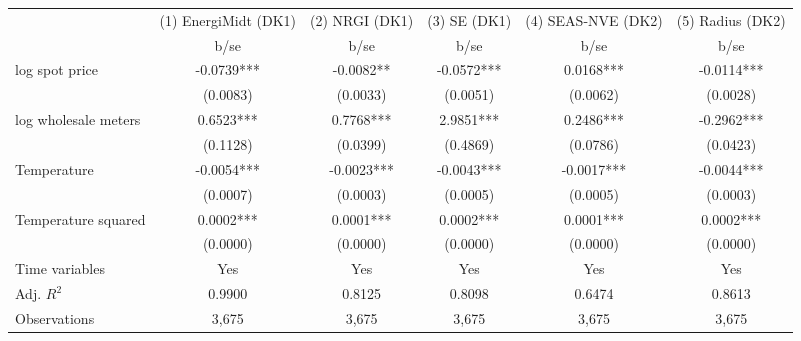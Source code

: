 \begin{tabular}{lccccc}\toprule
                    &(1) EnergiMidt (DK1)   &(2) NRGI (DK1)   &(3) SE (DK1)   &(4) SEAS-NVE (DK2)   &(5) Radius (DK2)   \\
                    &        b/se   &        b/se   &        b/se   &        b/se   &        b/se   \\
\midrule
log spot price      &     -0.0739***&     -0.0082** &     -0.0572***&      0.0168***&     -0.0114***\\
                    &    (0.0083)   &    (0.0033)   &    (0.0051)   &    (0.0062)   &    (0.0028)   \\
log wholesale meters&      0.6523***&      0.7768***&      2.9851***&      0.2486***&     -0.2962***\\
                    &    (0.1128)   &    (0.0399)   &    (0.4869)   &    (0.0786)   &    (0.0423)   \\
Temperature         &     -0.0054***&     -0.0023***&     -0.0043***&     -0.0017***&     -0.0044***\\
                    &    (0.0007)   &    (0.0003)   &    (0.0005)   &    (0.0005)   &    (0.0003)   \\
Temperature squared &      0.0002***&      0.0001***&      0.0002***&      0.0001***&      0.0002***\\
                    &    (0.0000)   &    (0.0000)   &    (0.0000)   &    (0.0000)   &    (0.0000)   \\
Time variables      &         Yes   &         Yes   &         Yes   &         Yes   &         Yes   \\
\midrule
Adj. \(R^2\)        &      0.9900   &      0.8125   &      0.8098   &      0.6474   &      0.8613   \\
Observations        &       3,675   &       3,675   &       3,675   &       3,675   &       3,675   \\
\bottomrule\end{tabular}
